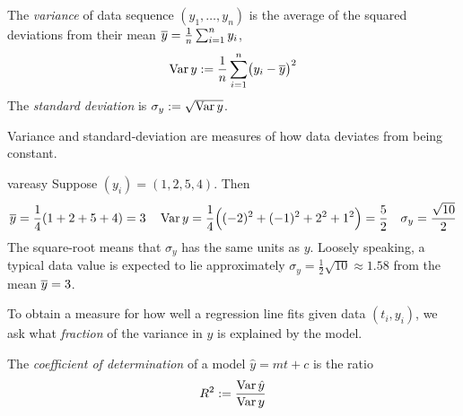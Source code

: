 \begin{defn}{}{}
	The \emph{variance} of data sequence $(y_1,\ldots,y_n)$ is the average of the squared deviations from their mean $\overline{y}=\frac 1n\sum_{i=1}^ny_i$,
	\[
		\operatorname{Var} y:=\frac 1n\sum_{i=1}^n\bigl(y_i-\overline{y}\bigr)^2
	\]
	The \emph{standard deviation} is $\sigma_y:=\sqrt{\operatorname{Var} y}$.
\end{defn}

Variance and standard-deviation are measures of how data deviates from being constant.

\begin{example}{}{vareasy}
	Suppose $(y_i)=(1,2,5,4)$. Then
	\begin{align*}
		&\cl y=\frac 14(1+2+5+4)=3
		&&\Var y=\frac 14\Bigl((-2)^2+(-1)^2+ 2^2+1^2\Bigr) =\frac 52
		&\sigma_y=\frac{\sqrt{10}}2%
	\end{align*}
	The square-root means that $\sigma_y$ has the same units as $y$. Loosely speaking, a typical data value is expected to lie approximately $\sigma_y=\frac 12\sqrt{10}\approx 1.58$ from the mean $\overline{y}=3$.
\end{example}

To obtain a measure for how well a regression line fits given data $(t_i,y_i)$, we ask what \emph{fraction} of the variance in $y$ is explained by the model.

\begin{defn}{}{}
	The \emph{coefficient of determination} of a model $\hat y=mt+c$ is the ratio
	\[
		R^2:=\frac{\operatorname{Var}\hat y}{\operatorname{Var} y}
	\]
\end{defn}

